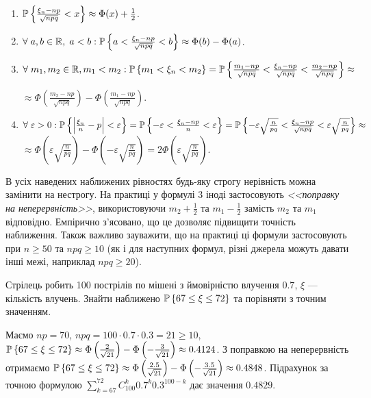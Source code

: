 \begin{enumerate}
    \item $\P\left\{ \frac{\xi_n - np}{\sqrt{n p q}} < x\right\} \approx \Phi(x) + \frac{1}{2}$.
    \item $\forall \; a, b \in \mathbb{R}, \; a<b : \P\left\{a < \frac{\xi_n - np}{\sqrt{n p q}} < b\right\} \approx \Phi(b) - \Phi(a)$.
    \item $\forall \; m_1, m_2 \in \mathbb{R}, m_1<m_2 : \P\left\{ m_1 < \xi_n < m_2\right\} = 
    \P\left\{\frac{m_1 - np}{\sqrt{n p q}} < \frac{\xi_n - np}{\sqrt{n p q}} < \frac{m_2 - np}{\sqrt{n p q}}\right\} \approx$

    $\approx \Phi\left(\frac{m_2 - np}{\sqrt{n p q}}\right) - \Phi\left(\frac{m_1 - np}{\sqrt{n p q}}\right)$.
    \item $\forall \; \varepsilon > 0 : \P\left\{ \left|\frac{\xi_n}{n} - p\right| < \varepsilon\right\} = 
    \P\left\{-\varepsilon < \frac{\xi_n - np}{n} < \varepsilon\right\} =
    \P\left\{-\varepsilon \sqrt{\frac{n}{pq}} < \frac{\xi_n - np}{\sqrt{n p q}} < \varepsilon \sqrt{\frac{n}{pq}}\right\} \approx$
    $\approx \Phi\left( \varepsilon \sqrt{\frac{n}{pq}}\right) - \Phi\left( -\varepsilon \sqrt{\frac{n}{pq}}\right) = 2\Phi\left( \varepsilon \sqrt{\frac{n}{pq}}\right)$.
\end{enumerate}
\begin{remark}
    В усіх наведених наближених рівностях будь-яку строгу нерівність можна замінити на нестрогу. На практиці у формулі 3 іноді застосовують \emph{<<поправку на неперервність>>},
    використовуючи $m_2 + \frac{1}{2}$ та $m_1 - \frac{1}{2}$ замість $m_2$ та $m_1$ відповідно. Емпірично з'ясовано, що це дозволяє підвищити точність наближення.
    Також важливо зауважити, що на практиці ці формули застосовують при $n \geq 50$ та $npq \geq 10$ (як і для наступних формул, 
    різні джерела можуть давати інші межі, наприклад $npq \geq 20$).
\end{remark}
\begin{example}
    Стрілець робить 100 пострілів по мішені з ймовірністю влучення $0.7$, $\xi$ --- кількість влучень. Знайти наближено 
    $\P\left\{ 67 \leq \xi \leq 72\right\}$ та порівняти з точним значенням.
    
    \noindent Маємо $np = 70$, $npq = 100 \cdot 0.7 \cdot 0.3 = 21 \geq 10$, $\P\left\{ 67 \leq \xi \leq 72\right\} \approx 
    \Phi\left( \frac{2}{\sqrt{21}}\right) - \Phi\left(-\frac{3}{\sqrt{21}}\right) \approx 0.4124$.
    З поправкою на неперервність отримаємо 
    $\P\left\{ 67 \leq \xi \leq 72\right\} \approx 
    \Phi\left( \frac{2.5}{\sqrt{21}}\right) - \Phi\left(-\frac{3.5}{\sqrt{21}}\right) \approx 0.4848$.
    Підрахунок за точною формулою $\sum\limits_{k=67}^{72} C_{100}^{k} 0.7^k 0.3^{100-k}$ дає значення $0.4829$.
\end{example}


